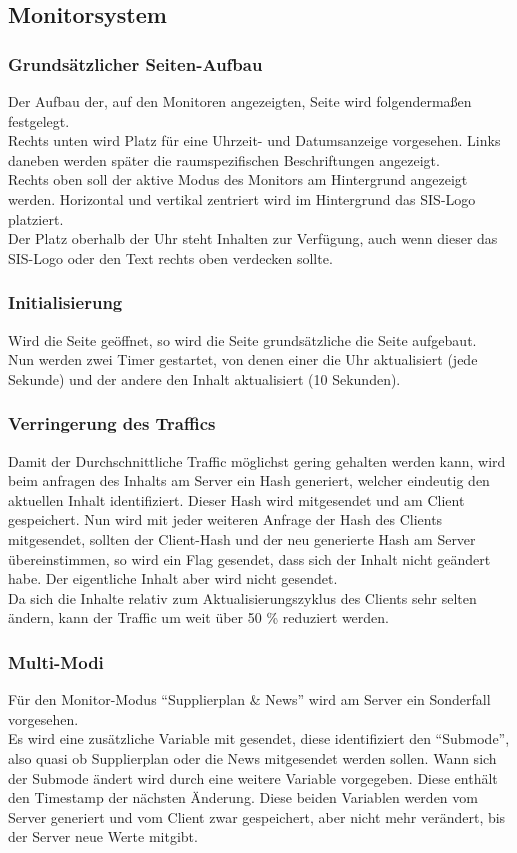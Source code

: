 \subsection{Monitorsystem}

\subsubsection{Grundsätzlicher Seiten-Aufbau}

Der Aufbau der, auf den Monitoren angezeigten, Seite wird folgendermaßen festgelegt.\\
Rechts unten wird Platz für eine Uhrzeit- und Datumsanzeige vorgesehen. Links daneben werden später die raumspezifischen Beschriftungen angezeigt.\\
Rechts oben soll der aktive Modus des Monitors am Hintergrund angezeigt werden. Horizontal und vertikal zentriert wird im Hintergrund das SIS-Logo platziert.\\
Der Platz oberhalb der Uhr steht Inhalten zur Verfügung, auch wenn dieser das SIS-Logo oder den Text rechts oben verdecken sollte.

\subsubsection{Initialisierung}

Wird die Seite geöffnet, so wird die Seite grundsätzliche die Seite aufgebaut.\\
Nun werden zwei Timer gestartet, von denen einer die Uhr aktualisiert (jede Sekunde) und der andere den Inhalt aktualisiert (10 Sekunden).

\subsubsection{Verringerung des Traffics}
Damit der Durchschnittliche Traffic möglichst gering gehalten werden kann, wird beim anfragen des Inhalts am Server ein Hash generiert, welcher eindeutig den aktuellen Inhalt identifiziert. Dieser Hash wird mitgesendet und am Client gespeichert. Nun wird mit jeder weiteren Anfrage der Hash des Clients mitgesendet, sollten der Client-Hash und der neu generierte Hash am Server übereinstimmen, so wird ein Flag gesendet, dass sich der Inhalt nicht geändert habe. Der eigentliche Inhalt aber wird nicht gesendet.\\
Da sich die Inhalte relativ zum Aktualisierungszyklus des Clients sehr selten ändern, kann der Traffic um weit über 50 \% reduziert werden.

\subsubsection{Multi-Modi}
Für den Monitor-Modus \enquote{Supplierplan \& News} wird am Server ein Sonderfall vorgesehen.\\
Es wird eine zusätzliche Variable mit gesendet, diese identifiziert den \enquote{Submode}, also quasi ob Supplierplan oder die News mitgesendet werden sollen. Wann sich der Submode ändert wird durch eine weitere Variable vorgegeben. Diese enthält den Timestamp der nächsten Änderung. Diese beiden Variablen werden vom Server generiert und vom Client zwar gespeichert, aber nicht mehr verändert, bis der Server neue Werte mitgibt.